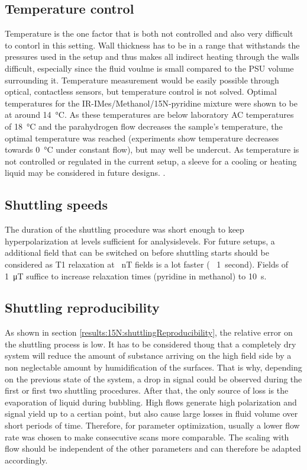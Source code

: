         \subsection{Temperature control}
        \label{cd:sabreShuttling:tempControl}
            Temperature is the one factor that is both not controlled and also very difficult to contorl in this setting. Wall thickness has to be in a range that withstands the pressures used in the setup and thus makes all indirect heating through the walls difficult, especially since the fluid voulme is small compared to the PSU volume surrounding it. Temperature measurement would be easily possible through optical, contactless sensors, but temperature control is not solved. Optimal temperatures for the IR-IMes/Methanol/15N-pyridine mixture were shown to be at around \SI{14}{\celsius}. As these temperatures are below laboratory AC temperatures of \SI{18}{\celsius} and the parahydrogen flow decreases the sample's temperature, the optimal temperature was reached (experiments show temperature decreases towards \SI{0}{\celsius} under constant flow), but may well be undercut. As temperature is not controlled or regulated in the current setup, a sleeve for a cooling or heating liquid may be considered in future designs. .
        \subsection{Shuttling speeds}
            The duration of the shuttling procedure was short enough to keep hyperpolarization at levels sufficient for analysislevels. For future setups, a additional field that can be switched on before shuttling starts should be considered as T1 relaxation at \SI{}{\nano\tesla} fields is a lot faster (~ \SI{1}{second}). Fields of \SI{1}{\micro\tesla} suffice to increase relaxation times (pyridine in methanol) to  \SI{10}{\second}. 
        \subsection{Shuttling reproducibility}
            As shown in section \ref{results:15N:shuttlingReproducibility}, the relative error on the shuttling process is low. It has to be considered thoug that a completely dry system will reduce the amount of substance arriving on the high field side by a non neglectable amount by humidification of the surfaces. That is why, depending on the previous state of the system, a drop in signal could be observed during the first or first two shuttling procedures. After that, the only source of loss is the evaporation of liquid during bubbling. High flows generate high polarization and signal yield up to a certian point, but also cause large losses in fluid volume over short periods of time. Therefore, for parameter optimization, usually  a lower flow rate was chosen to make consecutive scans more comparable. The scaling with flow should be independent of the other parameters and can therefore be adapted accordingly.
